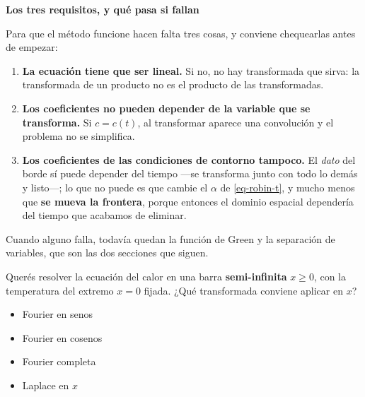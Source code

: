 \documentclass[
  spanish,
  a4paper,
]{scrbook}
\providecommand{\tightlist}{%
  \setlength{\itemsep}{0pt}\setlength{\parskip}{0pt}}
\theoremstyle{definition}
\theoremstyle{plain}
\theoremstyle{definition}
\theoremstyle{plain}
\theoremstyle{definition}
\theoremstyle{remark}
\begin{document}
\begin{tcolorbox}[enhanced jigsaw, arc=.35mm, bottomrule=.15mm, breakable, colback=white, colframe=quarto-callout-warning-color-frame, left=2mm, leftrule=.75mm, opacityback=0, rightrule=.15mm, toprule=.15mm]
\begin{minipage}[t]{5.5mm}
\textcolor{quarto-callout-warning-color}{\faExclamationTriangle}
\end{minipage}%
\begin{minipage}[t]{\textwidth - 5.5mm}

\vspace{-3mm}\textbf{Los tres requisitos, y qué pasa si fallan}\vspace{3mm}

Para que el método funcione hacen falta tres cosas, y conviene
chequearlas antes de empezar:

\begin{enumerate}
\def\labelenumi{\arabic{enumi}.}
\tightlist
\item
  \textbf{La ecuación tiene que ser lineal.} Si no, no hay transformada
  que sirva: la transformada de un producto no es el producto de las
  transformadas.
\item
  \textbf{Los coeficientes no pueden depender de la variable que se
  transforma.} Si \(c = c(t)\), al transformar aparece una convolución y
  el problema no se simplifica.
\item
  \textbf{Los coeficientes de las condiciones de contorno tampoco.} El
  \emph{dato} del borde sí puede depender del tiempo ---se transforma
  junto con todo lo demás y listo---; lo que no puede es que cambie el
  \(\alpha\) de \ref{eq-robin-t}, y mucho menos que \textbf{se mueva la
  frontera}, porque entonces el dominio espacial dependería del tiempo
  que acabamos de eliminar.
\end{enumerate}

Cuando alguno falla, todavía quedan la función de Green y la separación
de variables, que son las dos secciones que siguen.

\end{minipage}%
\end{tcolorbox}

Querés resolver la ecuación del calor en una barra
\textbf{semi-infinita} \(x\ge 0\), con la temperatura del extremo
\(x=0\) fijada. ¿Qué transformada conviene aplicar en \(x\)?

\begin{itemize}
\tightlist
\item
  {Fourier en senos}
\item
  {Fourier en cosenos}
\item
  {Fourier completa}
\item
  {Laplace en \(x\)}
\end{itemize}
\end{document}
